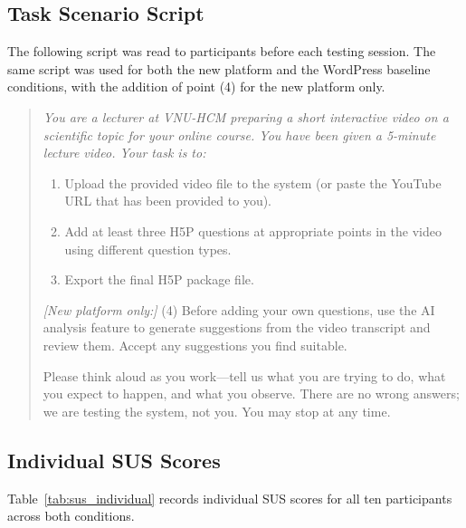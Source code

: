 \subsection{Task Scenario Script}

The following script was read to participants before each testing session.
The same script was used for both the new platform and the WordPress
baseline conditions, with the addition of point (4) for the new platform
only.

\begin{quote}
\itshape
You are a lecturer at VNU-HCM preparing a short interactive video on a
scientific topic for your online course. You have been given a 5-minute
lecture video. Your task is to:

\begin{enumerate}
  \item Upload the provided video file to the system (or paste the
  YouTube URL that has been provided to you).
  \item Add at least three H5P questions at appropriate points in the
  video using different question types.
  \item Export the final H5P package file.
\end{enumerate}

\textit{[New platform only:]} (4) Before adding your own questions, use
the AI analysis feature to generate suggestions from the video transcript
and review them. Accept any suggestions you find suitable.

Please think aloud as you work---tell us what you are trying to do, what
you expect to happen, and what you observe. There are no wrong answers; we
are testing the system, not you. You may stop at any time.
\end{quote}

\subsection{Individual SUS Scores}

Table~\ref{tab:sus_individual} records individual SUS scores for all ten
participants across both conditions.

